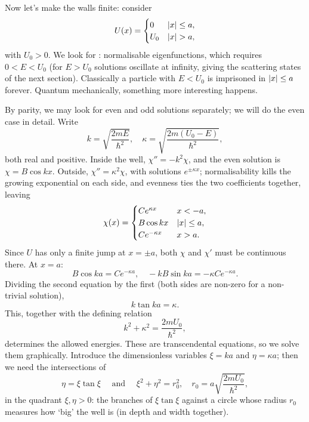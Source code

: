 \documentclass[a4paper]{scrartcl}
\begin{document}
Now let's make the walls finite: consider
$$
U(x) = \begin{cases}
    0 & \lvert x\rvert \leq a, \\
    U_0 & \lvert x\rvert > a,
\end{cases}
$$
with $U_0 > 0$. We look for : normalisable eigenfunctions, which requires $0 < E < U_0$ (for $E > U_0$ solutions oscillate at infinity, giving the scattering states of the next section). Classically a particle with $E < U_0$ is imprisoned in $\lvert x\rvert \leq a$ forever. Quantum mechanically, something more interesting happens.

By parity, we may look for even and odd solutions separately; we will do the even case in detail. Write
$$
k = \sqrt{\frac{2mE}{\hbar^2}}, \quad \kappa = \sqrt{\frac{2m(U_0 - E)}{\hbar^2}},
$$
both real and positive. Inside the well, $\chi'' = -k^2 \chi$, and the even solution is $\chi = B\cos kx$. Outside, $\chi'' = \kappa^2 \chi$, with solutions $e^{\pm \kappa x}$; normalisability kills the growing exponential on each side, and evenness ties the two coefficients together, leaving
$$
\chi(x) = \begin{cases}
    C e^{\kappa x} & x < -a, \\
    B \cos kx & \lvert x\rvert \leq a, \\
    C e^{-\kappa x} & x > a.
\end{cases}
$$
Since $U$ has only a finite jump at $x = \pm a$, both $\chi$ and $\chi'$ must be continuous there. At $x = a$:
$$
B \cos ka = C e^{-\kappa a}, \quad -kB\sin ka = -\kappa C e^{-\kappa a}.
$$
Dividing the second equation by the first (both sides are non-zero for a non-trivial solution),
$$
k \tan ka = \kappa.
$$
This, together with the defining relation
$$
k^2 + \kappa^2 = \frac{2 m U_0}{\hbar^2},
$$
determines the allowed energies. These are transcendental equations, so we solve them graphically. Introduce the dimensionless variables $\xi = ka$ and $\eta = \kappa a$; then we need the intersections of
$$
\eta = \xi \tan \xi \quad \text{ and } \quad \xi^2 + \eta^2 = r_0^2, \quad r_0 = a\sqrt{\frac{2 m U_0}{\hbar^2}},
$$
in the quadrant $\xi, \eta > 0$: the branches of $\xi \tan \xi$ against a circle whose radius $r_0$ measures how `big' the well is (in depth and width together).
\end{document}
